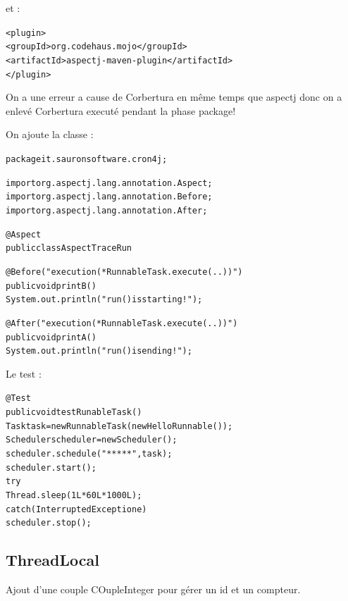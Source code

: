 \documentclass{article}
\begin{document}
et :

\begin{alltt}
<plugin>
	<groupId>org.codehaus.mojo</groupId>
	<artifactId>aspectj-maven-plugin</artifactId>
      </plugin>
\end{alltt}

On a une erreur a cause de Corbertura en même temps que aspectj donc on a enlevé Corbertura executé pendant la phase package!

On ajoute la classe :

\begin{alltt}

package it.sauronsoftware.cron4j;

import org.aspectj.lang.annotation.Aspect;
import org.aspectj.lang.annotation.Before;
import org.aspectj.lang.annotation.After;

@Aspect
    public class AspectTraceRun {

    @Before("execution(* RunnableTask.execute(..))")
	public void printB () { 
	System.out.println("run() is starting!");
    }

    @After("execution(* RunnableTask.execute(..))")
	public void printA () { 
	System.out.println("run() is ending!");
    }
}
\end{alltt}

Le test :

\begin{alltt}
@Test
	public void testRunableTask() {
	Task task = new RunnableTask(new HelloRunnable());
	Scheduler scheduler = new Scheduler();
	scheduler.schedule("* * * * *", task);
	scheduler.start();
	try {
	    Thread.sleep(1L * 60L * 1000L);
	} catch (InterruptedException e) {}
	scheduler.stop();
    }
\end{alltt}

\subsection{ThreadLocal}

Ajout d'une couple COupleInteger pour gérer un id et un compteur.
\end{document}
